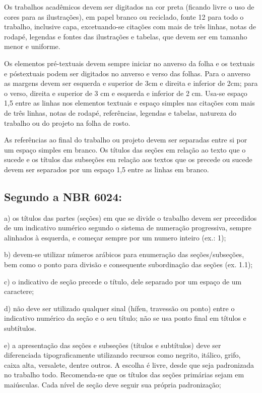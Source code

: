 Os trabalhos acadêmicos devem ser digitados na cor preta (ficando livre o uso de cores para
as ilustrações), em papel branco ou reciclado, fonte 12 para todo o trabalho, inclusive
capa, excetuando-se citações com mais de três linhas, notas de rodapé, legendas e fontes das
ilustrações e tabelas, que devem ser em tamanho menor e uniforme.

Os elementos pré-textuais devem sempre iniciar no anverso da folha e os textuais e póstextuais
podem ser digitados no anverso e verso das folhas. Para o anverso as margens devem
ser esquerda e superior de 3cm e direita e inferior de 2cm; para o verso, direita e superior de 3
cm e esquerda e inferior de 2 cm.
Usa-se espaço 1,5 entre as linhas nos elementos textuais e espaço simples nas citações com
mais de três linhas, notas de rodapé, referências, legendas e tabelas, natureza do trabalho ou
do projeto na folha de rosto.

As referências ao final do trabalho ou projeto devem ser
separadas entre si por um espaço simples em branco. Os títulos das seções em relação ao
texto que o sucede e os títulos das subseções em relação aos textos que os precede ou sucede
devem ser separados por um espaço 1,5 entre as linhas em branco. 

\subsection{Segundo a NBR 6024:}

a) os títulos das partes (seções) em que se divide o trabalho devem ser precedidos de um
indicativo numérico segundo o sistema de numeração progressiva, sempre alinhados à
esquerda, e começar sempre por um numero inteiro (ex.: 1);

b) devem-se utilizar números arábicos para enumeração das seções/subseções, bem como o
ponto para divisão e consequente subordinação das seções (ex. 1.1);

c) o indicativo de seção precede o título, dele separado por um espaço de um caractere;

d) não deve ser utilizado qualquer sinal (hífen, travessão ou ponto) entre o indicativo
numérico da seção e o seu título; não se usa ponto final em títulos e subtítulos.

e) a apresentação das seções e subseções (títulos e subtítulos) deve ser diferenciada
tipograficamente utilizando recursos como negrito, itálico, grifo, caixa alta, versalete,
dentre outros. A escolha é livre, desde que seja padronizada no trabalho todo.
Recomenda-se que os títulos das seções primárias sejam em maiúsculas. Cada nível de
seção deve seguir sua própria padronização;

